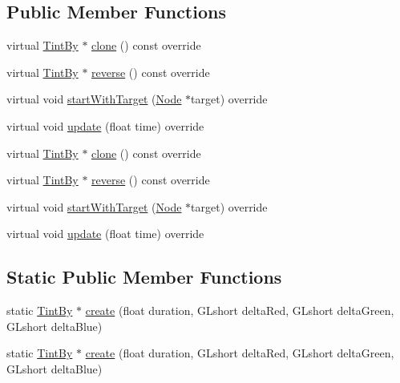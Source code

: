 \subsection*{Public Member Functions}
\begin{DoxyCompactItemize}
\item 
virtual \hyperlink{classTintBy}{Tint\+By} $\ast$ \hyperlink{classTintBy_a01fb266a5a274c34fae1678860b31034}{clone} () const override
\item 
virtual \hyperlink{classTintBy}{Tint\+By} $\ast$ \hyperlink{classTintBy_a674e95cda92174cc3f564385b925b1aa}{reverse} () const override
\item 
virtual void \hyperlink{classTintBy_a7fd302e5928e7ffbfe6f42cffc931990}{start\+With\+Target} (\hyperlink{classNode}{Node} $\ast$target) override
\item 
virtual void \hyperlink{classTintBy_af8e773a8164eed5d22d3ff801d5f6569}{update} (float time) override
\item 
virtual \hyperlink{classTintBy}{Tint\+By} $\ast$ \hyperlink{classTintBy_ad0e16ede575fa7496de3191baeba9d95}{clone} () const override
\item 
virtual \hyperlink{classTintBy}{Tint\+By} $\ast$ \hyperlink{classTintBy_aec2d9f08e1fa5b4448e9bd524d60f1ae}{reverse} () const override
\item 
virtual void \hyperlink{classTintBy_a51b72cc71384a7a7dc3e47ecb71e9d44}{start\+With\+Target} (\hyperlink{classNode}{Node} $\ast$target) override
\item 
virtual void \hyperlink{classTintBy_aabf7d54981877b1e78b6bbd4cc046b5f}{update} (float time) override
\end{DoxyCompactItemize}
\subsection*{Static Public Member Functions}
\begin{DoxyCompactItemize}
\item 
static \hyperlink{classTintBy}{Tint\+By} $\ast$ \hyperlink{classTintBy_a48ae19b213fee7b49b2c89418114d9da}{create} (float duration, G\+Lshort delta\+Red, G\+Lshort delta\+Green, G\+Lshort delta\+Blue)
\item 
static \hyperlink{classTintBy}{Tint\+By} $\ast$ \hyperlink{classTintBy_ae90faa75e764f7c1659398e32b35078c}{create} (float duration, G\+Lshort delta\+Red, G\+Lshort delta\+Green, G\+Lshort delta\+Blue)
\end{DoxyCompactItemize}
